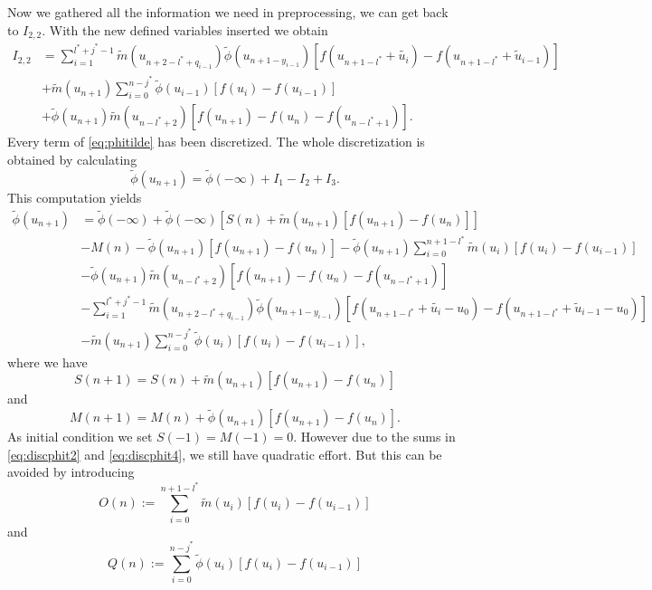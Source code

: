 \documentclass[12pt,a4paper,twoside, open=right]{scrreprt}
\theoremstyle{definition}
\theoremstyle{plain}
\begin{document}
Now we gathered all the information we need in preprocessing, we can get back to $I_{2,2}$. With the new defined variables inserted we obtain
\begin{align}
    I_{2,2}&= \sum_{i=1}^{l^*+j^*-1}\tilde{m}(u_{n+2-l^*+q_{i-1}})\tilde{\phi}(u_{n+1-y_{i-1}})[f(u_{n+1-l^*}+\tilde{u_i})-f(u_{n+1-l^*}+\tilde{u}_{i-1})]\\&+\tilde{m}(u_{n+1})\sum_{i=0}^{n-j^*}\tilde\phi(u_{i-1})[f(u_i)-f(u_{i-1})] \\&+ \tilde\phi(u_{n+1})\tilde{m}(u_{n-l^*+2})[f(u_{n+1})-f(u_n)-f(u_{n-l^*+1})].
\end{align}
Every term of \eqref{eq:phitilde} has been discretized. The whole discretization is obtained by calculating
\begin{equation}
    \tilde\phi(u_{n+1})=\tilde\phi(-\infty) + I_1 -I_2 +I_3.
\end{equation}
This computation yields
\begin{align}
    \tilde\phi(u_{n+1})&=\tilde\phi(-\infty) +\tilde\phi(-\infty)[S(n)+\tilde{m}(u_{n+1})[f(u_{n+1})-f(u_n)]]\label{eq:discphit1}\\&-M(n)\label{eq:discphit2} -\tilde\phi(u_{n+1})[f(u_{n+1})-f(u_{n})]  -\tilde{\phi}(u_{n+1})\sum_{i=0}^{n+1-l^*}\tilde{m}(u_i)[f(u_i)-f(u_{i-1})]\\&- \tilde\phi(u_{n+1})\tilde{m}(u_{n-l^*+2})[f(u_{n+1})-f(u_n)-f(u_{n-l^*+1})] \\&\label{eq:discphit3}-\sum_{i=1}^{l^*+j^*-1}\tilde{m}(u_{n+2-l^*+q_{i-1}})\tilde{\phi}(u_{n+1-y_{i-1}})[f(u_{n+1-l^*}+\tilde{u_i}-u_0)-f(u_{n+1-l^*}+\tilde{u}_{i-1}-u_0)]\\&\label{eq:discphit4}-\tilde{m}(u_{n+1})\sum_{i=0}^{n-j^*}\tilde\phi(u_{i})[f(u_i)-f(u_{i-1})],
\end{align}
where we have
\begin{equation}
    S(n+1) = S(n)+\tilde{m}(u_{n+1})[f(u_{n+1})-f(u_n)]
\end{equation}
and 
\begin{equation}
    M(n+1) = M(n) + \tilde\phi(u_{n+1})[f(u_{n+1})-f(u_{n})].
\end{equation}
As initial condition we set $S(-1)=M(-1)=0$. However due to the sums in \eqref{eq:discphit2} and \eqref{eq:discphit4}, we still have quadratic effort. But this can be avoided by introducing 
\begin{equation}
    O(n):=\sum_{i=0}^{n+1-l^*}\tilde{m}(u_i)[f(u_i)-f(u_{i-1})]
\end{equation}
and 
\begin{equation}
    Q(n):=\sum_{i=0}^{n-j^*}\tilde\phi(u_{i})[f(u_i)-f(u_{i-1})]
\end{equation}
\end{document}
